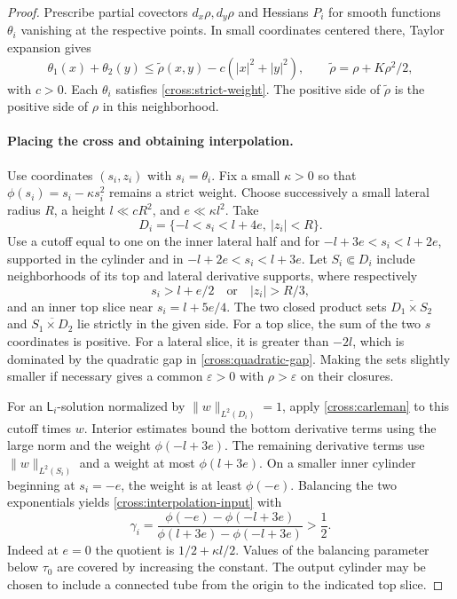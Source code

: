 \begin{proof}
Prescribe partial covectors $d_x\rho,d_y\rho$ and Hessians $P_i$
for smooth functions
$\theta_i$ vanishing at the respective points.  In small coordinates
centered there, Taylor expansion gives
\begin{equation}\label{cross:quadratic-gap}
 \theta_1(x)+\theta_2(y)
 \le \widetilde\rho(x,y)-c(|x|^2+|y|^2),
 \qquad \widetilde\rho=\rho+K\rho^2/2,
\end{equation}
with $c>0$.  Each $\theta_i$ satisfies
\eqref{cross:strict-weight}.  The positive side of $\widetilde\rho$
is the positive side of $\rho$ in this neighborhood.

\paragraph{Placing the cross and obtaining interpolation.}
Use coordinates $(s_i,z_i)$ with $s_i=\theta_i$. Fix a small
$\kappa>0$ so that $\phi(s_i)=s_i-\kappa s_i^2$ remains a strict weight.
Choose successively a small lateral radius $R$, a height
$l\ll cR^2$, and $e\ll\kappa l^2$.  Take
\[
 D_i=\{-l<s_i<l+4e,\ |z_i|<R\}.
\]
Use a cutoff equal to one on the inner lateral half and for
$-l+3e<s_i<l+2e$, supported in the cylinder and in
$-l+2e<s_i<l+3e$.
Let $S_i\Subset D_i$ include neighborhoods of its top and lateral
derivative supports, where respectively
\[
 s_i>l+e/2\quad\text{or}\quad |z_i|>R/3,
\]
and an inner top slice near $s_i=l+5e/4$.
The two closed product sets $\overline{D_1\times S_2}$ and
$\overline{S_1\times D_2}$ lie strictly in the given side.
For a top slice, the sum of the two $s$ coordinates is positive.
For a lateral slice, it is greater than $-2l$, which is dominated
by the quadratic gap in \eqref{cross:quadratic-gap}.
Making the sets slightly smaller if necessary gives a common
$\varepsilon>0$ with $\rho>\varepsilon$ on their closures.

For an $\mathsf L_i$-solution normalized by $\|w\|_{L^2(D_i)}=1$, apply
\eqref{cross:carleman} to this cutoff times $w$.  Interior estimates
bound the bottom derivative terms using the large norm and the weight
$\phi(-l+3e)$.  The remaining derivative terms use
$\|w\|_{L^2(S_i)}$ and a weight at most $\phi(l+3e)$.
On a smaller inner cylinder beginning at $s_i=-e$, the weight is at
least $\phi(-e)$.  Balancing the two exponentials yields
\eqref{cross:interpolation-input} with
\begin{equation}\label{cross:exponent}
 \gamma_i=
 \frac{\phi(-e)-\phi(-l+3e)}{
       \phi(l+3e)-\phi(-l+3e)}>\frac12.
\end{equation}
Indeed at $e=0$ the quotient is $1/2+\kappa l/2$.
Values of the balancing parameter below $\tau_0$ are covered by
increasing the constant.  The output cylinder may be chosen to include
a connected tube from the origin to the indicated top slice.


\end{proof}
